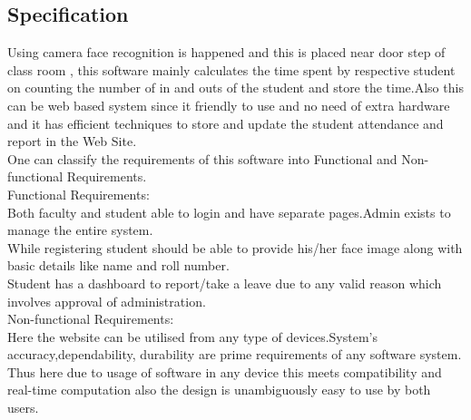 \documentclass[conference]{IEEEtran}
\begin{document}
\subsection{Specification}\label{AA}
Using camera face recognition is happened and this is placed near door step of class room , this software mainly calculates the time spent by respective student on counting the number of in and outs of the student and store the time.Also this can be web based system since it friendly to use and no need of extra hardware and it has efficient techniques to store and update the student attendance and report in the Web  Site. \\[9mm]
One can classify the requirements of this software into Functional and Non-functional Requirements.\\[3mm]
Functional Requirements:\\[2mm] Both faculty and student able to login and have separate pages.Admin exists to manage the entire system.\\[2mm]
While registering student should be able to provide his/her face image along with basic details like name and roll number.\\[2mm]
Student has a dashboard to report/take a leave due to any valid reason which involves approval of administration.\\[5mm]
Non-functional Requirements:\\[2mm]
Here the website can be utilised from any type of devices.System's accuracy,dependability, durability are prime requirements of any software system.\\[1mm]
Thus here due to usage of software in  any device this meets compatibility and real-time computation also the design is unambiguously easy to use by both users.\\[2mm]
\end{document}
